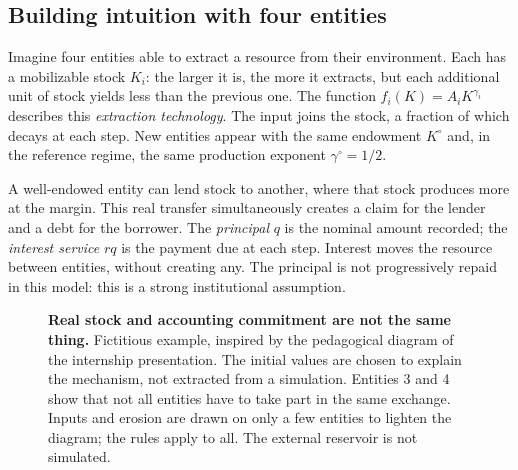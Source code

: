 \subsection{Building intuition with four entities}
Imagine four entities able to extract a resource from their
environment. Each has a mobilizable stock $K_i$: the larger it is,
the more it extracts, but each additional unit of stock yields less
than the previous one. The function $f_i(K)=A_iK^{\gamma_i}$
describes this \emph{extraction technology}. The input joins the
stock, a fraction of which decays at each step. New entities appear
with the same endowment $K^\circ$ and, in the reference regime,
the same production exponent $\gamma^\circ=1/2$.

A well-endowed entity can lend stock to another, where that stock
produces more at the margin. This real transfer simultaneously
creates a claim for the lender and a debt for the borrower. The
\emph{principal} $q$ is the nominal amount recorded; the \emph{interest
service} $rq$ is the payment due at each step. Interest moves the
resource between entities, without creating any. The principal is not
progressively repaid in this model: this is a strong institutional
assumption.

\begin{figure}[htbp]\centering
{}
\caption{\textbf{Real stock and accounting commitment are not the same thing.}
Fictitious example, inspired by the pedagogical diagram of the internship
presentation. The initial values are chosen to explain the mechanism, not
extracted from a simulation. Entities 3 and 4 show that not all entities
have to take part in the same exchange. Inputs and erosion are drawn on
only a few entities to lighten the diagram; the rules apply to all.
The external reservoir is not simulated.}
\label{fig:exemple}
\end{figure}

